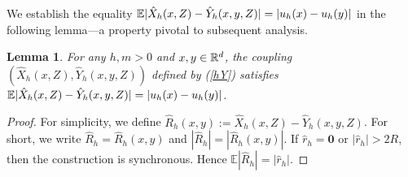 \documentclass[aap]{imsart}
\theoremstyle{plain}
\newtheorem{lemma}[theorem]{Lemma}
\theoremstyle{definition}
\begin{document}
We establish the equality $\mathbb{E}|\hat{X}_h(x,Z)-\hat{Y}_h(x, y,Z)| = |u_h(x)-u_h(y)|$ in the following lemma—a property pivotal to subsequent analysis.
\begin{lemma}\label{1mom}
	For any $h, m>0$ and $x, y\in\mathbb{R}^d$, the coupling $(\hat{X}_h(x,Z), \hat{Y}_h(x, y,Z))$ defined by (\ref{hY}) satisfies $\mathbb{E}|\hat{X}_h(x,Z)-\hat{Y}_h(x, y,Z)| = |u_h(x)-u_h(y)|$.
\end{lemma}

\begin{proof}
For simplicity, we define \(\hat{R}_h(x, y):=\hat{X}_h(x, Z)-\hat{Y}_h(x, y,Z)\).
For short, we write $\hat{R}_h = \hat{R}_h(x, y)$ and $|\hat{R}_h| = |\hat{R}_h(x, y)|$.
If \(\hat r_h=\mathbf 0\) or \(|\hat r_h|>2R\), then the construction is synchronous. Hence \(\mathbb E|\hat{R}_h|=|\hat r_h|\).	
	

\end{proof}
\end{document}
